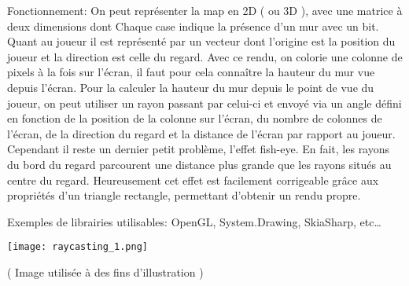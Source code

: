 \documentclass[french, 12pt]{article}
\begin{document}
\begin{flushleft}
        Fonctionnement: On peut représenter la map en 2D ( ou 3D ), avec une matrice à deux dimensions dont Chaque case indique la présence d'un mur avec un bit. Quant au joueur il est représenté par un vecteur dont l'origine est la position du joueur et la direction est celle du regard. Avec ce rendu, on colorie une colonne de pixels à la fois sur l'écran, il faut pour cela connaître la hauteur du mur vue depuis l'écran. Pour la calculer la hauteur du mur depuis le point de vue du joueur, on peut utiliser un rayon passant par celui-ci et envoyé via un angle défini en fonction de la position de la colonne sur l’écran, du nombre de colonnes de l'écran, de la direction du regard et la distance de l’écran par rapport au joueur. Cependant il reste un dernier petit problème, l’effet fish-eye. En fait, les rayons du bord du regard parcourent une distance plus grande que les rayons situés au centre du regard. Heureusement cet effet est facilement corrigeable grâce aux propriétés d’un triangle rectangle, permettant d’obtenir un rendu propre. \newline


        Exemples de librairies utilisables: OpenGL, System.Drawing, SkiaSharp, etc…
        
    \end{flushleft}
    \begin{center}
            \texttt{[image: raycasting\_1.png]}
            
            \tiny\color{gray}( Image utilisée à des fins d’illustration )
    \end{center}
    \newpage

\end{document}
